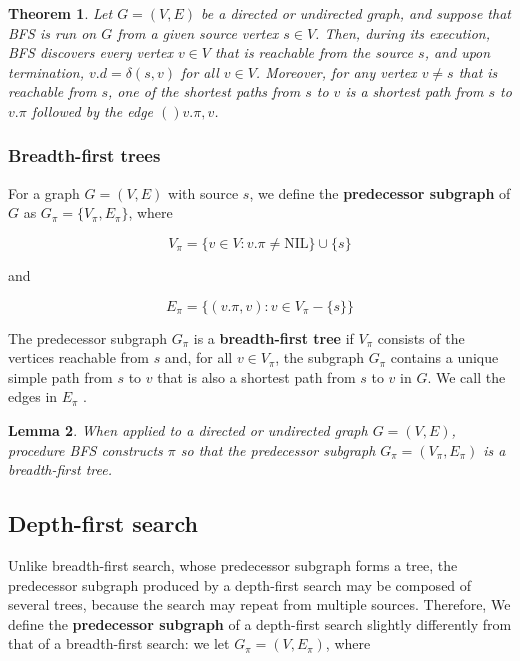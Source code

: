 \documentclass[12pt]{article}
\newtheorem{theorem}{Theorem}
\newtheorem{lemma}[theorem]{Lemma}
\begin{document}
\begin{theorem}
  Let $G = (V,E)$ be a directed or undirected graph, and suppose that BFS is run on $G$ from a given source vertex $s \in V$. Then, during its execution, BFS discovers every vertex $v \in V$ that is reachable from the source $s$, and upon termination, $v.d = \delta (s,v)$ for all $v \in V$. Moreover, for any vertex $v \neq s$ that is reachable from $s$, one of the shortest paths from $s$ to $v$ is a shortest path from $s$ to $v.\pi$ followed by the edge $()v.\pi, v$.
\end{theorem}

\subsubsection*{Breadth-first trees}

For a graph $G = (V,E)$ with source $s$, we define the \textbf{predecessor subgraph} of $G$ as $G_{\pi} = \{ V_{\pi}, E_{\pi} \}$, where

\begin{equation*}
  V_{\pi} = \{ v \in V : v.\pi \neq \text{NIL} \} \cup \{ s \}
\end{equation*}

and

\begin{equation*}
  E_{\pi} = \{ (v.\pi, v) : v \in V_{\pi} - \{ s \} \} 
\end{equation*}

The predecessor subgraph $G_{\pi}$ is a \textbf{breadth-first tree} if $V_{\pi}$ consists of the vertices reachable from $s$ and, for all $v \in V_{\pi}$, the subgraph $G_{\pi}$ contains a unique simple path from $s$ to $v$ that is also a shortest path from $s$ to $v$ in $G$. We call the edges in $E_{\pi}$ .

\begin{lemma}
  When applied to a directed or undirected graph $G = (V,E)$, procedure BFS constructs $\pi$ so that the predecessor subgraph $G_{\pi} = (V_{\pi}, E_{\pi})$ is a breadth-first tree.
\end{lemma}

\subsection{Depth-first search}

Unlike breadth-first search, whose predecessor subgraph forms a tree, the predecessor subgraph produced by a depth-first search may be composed of several trees, because the search may repeat from multiple sources. Therefore, We define the \textbf{predecessor subgraph} of a depth-first search slightly differently from that of a breadth-first search: we let $G_{\pi} = (V, E_{\pi})$, where
\end{document}
